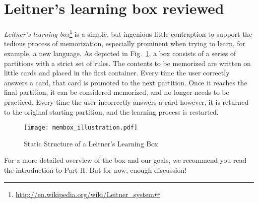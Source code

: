 \section{Leitner's learning box reviewed}

\emph{Leitner's learning box}\footnote{\href{http://en.wikipedia.org/wiki/Leitner\_system}{http://en.wikipedia.org/wiki/Leitner\_system}} is a simple, but
ingenious little contraption to support the tedious process of memorization, especially prominent when trying to learn, for example, a new language. As depicted
in Fig.~\ref{fig:membox_depiction}, a box consists of a series of partitions with a strict set of rules. The contents to be memorized are written on little
cards and placed in the first container. Every time the user correctly answers a card, that card is promoted to the next partition. Once it reaches the final
partition, it can be considered memorized, and no longer needs to be practiced. Every time the user incorrectly answers a card however, it is returned to the
original starting partition, and the learning process is restarted.

\begin{figure}[htbp]
	\centering
  \texttt{[image: membox\_illustration.pdf]}
	\caption{Static Structure of a Leitner's Learning Box}
	\label{fig:membox_depiction}
\end{figure}

For a more detailed overview of the box and our goals, we recommend you read the introduction to Part II. But for now, enough discussion!

